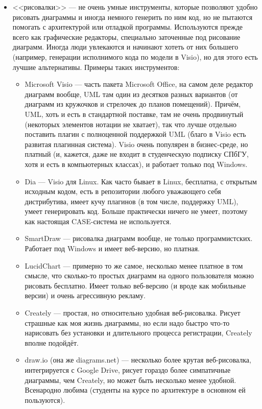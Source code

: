 \documentclass[a5paper]{article}
\begin{document}
\begin{itemize}
    \item <<рисовалки>> --- не очень умные инструменты, которые позволяют удобно рисовать диаграммы и иногда немного генерить по ним код, но не пытаются помогать с архитектурой или отладкой программы. Используются прежде всего как графические редакторы, специально заточенные под рисование диаграмм. Иногда люди увлекаются и начинают хотеть от них большего (например, генерации исполнимого кода по модели в Visio), но для этого есть лучшие альтернативы. Примеры таких инструментов:
    \begin{itemize}
        \item Microsoft Visio --- часть пакета Microsoft Office, на самом деле редактор диаграмм вообще, UML там один из десятков разных вариантов (от диаграмм из кружочков и стрелочек до планов помещений). Причём, UML, хоть и есть в стандартной поставке, там не очень продвинутый (некоторых элементов нотации не хватает), так что лучше отдельно поставить плагин с полноценной поддержкой UML (благо в Visio есть развитая плагинная система). Visio очень популярен в бизнес-среде, но платный (и, кажется, даже не входит в студенческую подписку СПбГУ, хотя и есть в компьютерных классах), и работает только под Windows.
        \item Dia --- Visio для Linux. Как часто бывает в Linux, бесплатна, с открытым исходным кодом, есть в репозитории любого уважающего себя дистрибутива, имеет кучу плагинов (в том числе, поддержку UML), умеет генерировать код. Больше практически ничего не умеет, поэтому как настоящая CASE-система не используется.
        \item SmartDraw --- рисовалка диаграмм вообще, не только программистских. Работает под Windows и имеет веб-версию, но платная.
        \item LucidChart --- примерно то же самое, несколько менее платное в том смысле, что сколько-то простых диаграмм на одного пользователя можно рисовать бесплатно. Имеет только веб-версию (и вроде как мобильные версии) и очень агрессивную рекламу.
        \item Creately --- простая, но относительно удобная веб-рисовалка. Рисует страшные как моя жизнь диаграммы, но если надо быстро что-то нарисовать без установки и длительного процесса регистрации, Creately вполне подойдёт.
        \item draw.io (она же diagrams.net) --- несколько более крутая веб-рисовалка, интегрируется с Google Drive, рисует гораздо более симпатичные диаграммы, чем Creately, но может быть несколько менее удобной. Всенародно любима (студенты на курсе по архитектуре в основном ей пользуются).

\end{itemize}
\end{itemize}
\end{document}
